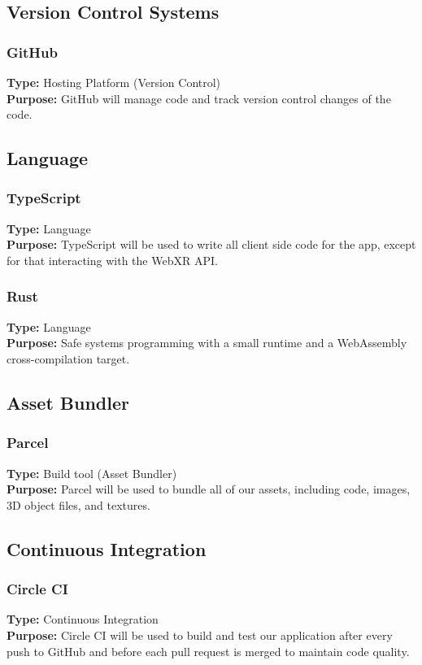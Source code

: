 \documentclass[onecolumn, draftclsnofoot,10pt, compsoc]{IEEEtran}
\begin{document}
\subsection{Version Control Systems}
\subsubsection{GitHub}
\textbf{Type:} Hosting Platform (Version Control)\\
\textbf{Purpose:} GitHub will manage code and track version control changes of the code. 

\subsection{Language}
\subsubsection{TypeScript}
\textbf{Type:} Language\\
\textbf{Purpose:} TypeScript will be used to write all client side code for the app, except for that interacting with the WebXR API.

\subsubsection{Rust}
\textbf{Type:} Language\\
\textbf{Purpose:} Safe systems programming with a small runtime and a WebAssembly cross-compilation target.

\subsection{Asset Bundler}
\subsubsection{Parcel}
\textbf{Type:} Build tool (Asset Bundler)\\
\textbf{Purpose:} Parcel will be used to bundle all of our assets, including code, images, 3D object files, and textures.

\subsection{Continuous Integration}
\subsubsection{Circle CI}
\textbf{Type:} Continuous Integration\\
\textbf{Purpose:} Circle CI will be used to build and test our application after every push to GitHub and before each pull request is merged to maintain code quality.
\end{document}
